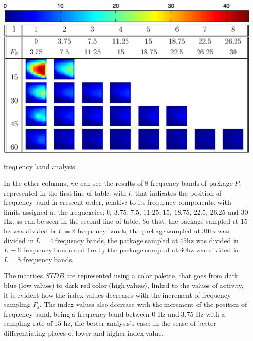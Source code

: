 \documentclass[review]{elsarticle}
\begin{document}
\begin{table}[h!]
\includegraphics[width=\textwidth]{colorbar.eps}
\includegraphics[width=\textwidth]{freq1.eps}
\caption{frequency band analysis}
\label{table:2}
\end{table}
In the other columns, we can see the results of $8$ frequency bands of package $P$,
represented in the first line of table, with $l$, that indicates the position of frequency band
in crescent order, relative to its frequency components, 
with limits assigned at the frequencies: $0$, $3.75$, $7.5$, $11.25$, $15$, $18.75$, $22.5$, $26.25$ and $30$Hz;
as can be seen in the second line of table.
So that, the package sampled at $15$hz was divided in $L=2$ frequency bands, 
the package sampled at $30$hz was divided in $L=4$ frequency bands, 
the package sampled at $45$hz was divided in $L=6$ frequency bands and finally
the package sampled at $60$hz was divided in $L=8$ frequency bands.

The matrices $STDB$ are represented using a color palette, 
that goes from dark blue (low values) to dark red color (high values), 
linked to the values of activity,
it is evident how the index values decreases with
the increment of frequency sampling $F_s$.
The index values also decrease with the increment of the position of frequency band,
being  a frequency band between $0$ Hz and $3.75$ Hz with a sampling rate of $15$ hz,
the better analysis's case; in the sense of better differentiating places of lower and higher index value.
\end{document}
